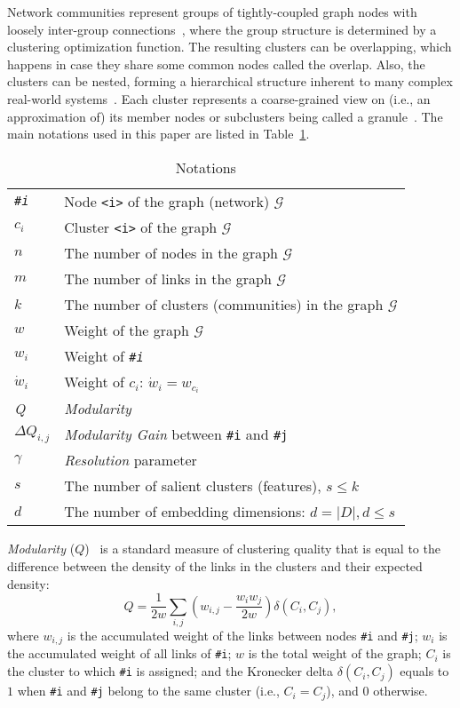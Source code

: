 \documentclass[conference]{IEEEtran}
\begin{document}
Network communities represent groups of tightly-coupled graph nodes with loosely inter-group connections~\cite{Newm03}, where the group structure is determined by a clustering optimization function.
The resulting clusters can be overlapping, which happens in case they share some common nodes called the overlap. Also, the clusters can be nested, forming a hierarchical structure inherent to many complex real-world systems~\cite{HSim62}. Each cluster represents a coarse-grained view on (i.e., an approximation of) its member nodes or subclusters being called a granule~\cite{YaoY01}.  The main notations used in this paper are listed in Table~\ref{tbl:nots}.
\begin{table}[htbp]\small  \centering
\caption{Notations}
\label{tbl:nots}
\vspace{-4pt}
\begin{tabular}{l|l}
\hline
{\it \verb|#i|}   	& {Node \verb|<i>| of the graph (network) $\mathcal{G}$}
\\ $c_i$				& {Cluster \verb|<i>| of the graph $\mathcal{G}$}
\\ $n$				& {The number of nodes in the graph $\mathcal{G}$}
\\ $m$				& {The number of links in the graph $\mathcal{G}$}
\\ $k$				& The number of clusters (communities) in the graph $\mathcal{G}$ \\ $w$				& {Weight of the graph $\mathcal{G}$}
\\ $w_i$				& Weight of {\it \verb|#i|} \\ $\dot{w}_i$				& Weight of $c_i$: $\dot{w}_i = w_{c_i}$ \\ \textit{Q}				& \emph{Modularity}
\\ $\Delta Q_{i,j}$	& \emph{Modularity Gain} between \verb|#i| and \verb|#j|
\\ \textit{$\gamma$}				& \emph{Resolution} parameter
\\ $s$				& The number of salient clusters (features), $s \le k$
\\ $d$				& The number of embedding dimensions: $d = |D|, d \le s$
\\ \hline
\end{tabular}
\vspace{-4pt}
\end{table}

\emph{Modularity} ($Q$)~\cite{Newm04u} is a standard measure of clustering quality that is equal to the difference between the density of the links in the clusters and their expected density: \begin{equation}  Q = \frac{1}{2w}\sum_{i,j}\left({w_{i,j} - \frac{w_i w_j}{2 w}}\right)\delta(C_i, C_j),
\label{eq:mod}
\end{equation}
where $w_{i,j}$ is the accumulated weight of the links between nodes \verb|#i| and \verb|#j|; $w_i$ is the accumulated weight of all links of \verb|#i|; $w$ is the total weight of the graph; $C_i$ is the cluster to which \verb|#i| is assigned; and the Kronecker delta $\delta(C_i, C_j)$ equals to $1$ when \verb|#i| and \verb|#j| belong to the same cluster (i.e., $C_i = C_j$), and $0$ otherwise.
\end{document}
